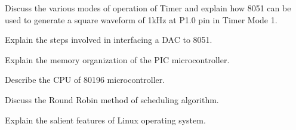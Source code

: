 \newpage \again

\item \iitem Discuss the various modes of operation of Timer and explain how 8051 can be used
  to generate a square waveform of 1kHz at P1.0 pin in Timer Mode 1.
\Or
\item Explain the steps involved in interfacing a DAC to 8051.
\ene

\item \iitem Explain the memory organization of the PIC microcontroller.
\Or
\item Describe the CPU of 80196 microcontroller.
\ene

\item  \iitem Discuss the Round Robin method of scheduling algorithm.
\Or
\item Explain the salient features of Linux operating system.
\ene

\markC
\ene
